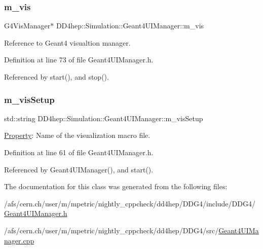 \subsubsection{\texorpdfstring{m\+\_\+vis}{m\_vis}}
{\footnotesize\ttfamily G4\+Vis\+Manager$\ast$ D\+D4hep\+::\+Simulation\+::\+Geant4\+U\+I\+Manager\+::m\+\_\+vis\hspace{0.3cm}{\ttfamily [protected]}}



Reference to Geant4 visualtion manager. 



Definition at line 73 of file Geant4\+U\+I\+Manager.\+h.



Referenced by start(), and stop().

\hypertarget{class_d_d4hep_1_1_simulation_1_1_geant4_u_i_manager_aa1bdcdb2a02479af8627ea0ba6d12f69}{}\label{class_d_d4hep_1_1_simulation_1_1_geant4_u_i_manager_aa1bdcdb2a02479af8627ea0ba6d12f69} 
\subsubsection{\texorpdfstring{m\+\_\+vis\+Setup}{m\_visSetup}}
{\footnotesize\ttfamily std\+::string D\+D4hep\+::\+Simulation\+::\+Geant4\+U\+I\+Manager\+::m\+\_\+vis\+Setup\hspace{0.3cm}{\ttfamily [protected]}}



\hyperlink{class_d_d4hep_1_1_property}{Property}\+: Name of the visualization macro file. 



Definition at line 61 of file Geant4\+U\+I\+Manager.\+h.



Referenced by Geant4\+U\+I\+Manager(), and start().



The documentation for this class was generated from the following files\+:\begin{DoxyCompactItemize}
\item 
/afs/cern.\+ch/user/m/mpetric/nightly\+\_\+cppcheck/dd4hep/\+D\+D\+G4/include/\+D\+D\+G4/\hyperlink{_geant4_u_i_manager_8h}{Geant4\+U\+I\+Manager.\+h}\item 
/afs/cern.\+ch/user/m/mpetric/nightly\+\_\+cppcheck/dd4hep/\+D\+D\+G4/src/\hyperlink{_geant4_u_i_manager_8cpp}{Geant4\+U\+I\+Manager.\+cpp}\end{DoxyCompactItemize}

